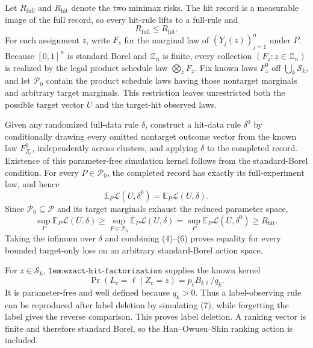 Let \(R_{\mathrm{full}}\) and \(R_{\mathrm{hit}}\) denote the two minimax risks.  The hit record is a measurable image of the full record, so every hit-rule lifts to a full-rule and
\[
 R_{\mathrm{full}}\leq R_{\mathrm{hit}}. \tag{4}
\]
For each assignment \(z\), write \(F_z\) for the marginal law of \((Y_j(z))_{j=1}^n\) under \(P\).  Because \([0,1]^n\) is standard Borel and \(\mathcal Z_n\) is finite, every collection \((F_z:z\in\mathcal Z_n)\) is realized by the legal product schedule law \(\bigotimes_zF_z\).  Fix known laws \(F_z^0\) off \(\bigcup_k\mathcal S_k\), and let \(\mathcal P_0\) contain the product schedule laws having those nontarget marginals and arbitrary target marginals.  This restriction leaves unrestricted both the possible target vector \(U\) and the target-hit observed laws.

Given any randomized full-data rule \(\delta\), construct a hit-data rule \(\delta^0\) by conditionally drawing every omitted nontarget outcome vector from the known law \(F_{Z_c}^0\), independently across clusters, and applying \(\delta\) to the completed record.  Existence of this parameter-free simulation kernel follows from the standard-Borel condition.  For every \(P\in\mathcal P_0\), the completed record has exactly its full-experiment law, and hence
\[
 \mathbb E_P\mathcal L(U,\delta^0)=\mathbb E_P\mathcal L(U,\delta). \tag{5}
\]
Since \(\mathcal P_0\subseteq\mathcal P\) and its target marginals exhaust the reduced parameter space,
\[
 \sup_P\mathbb E_P\mathcal L(U,\delta)
 \geq\sup_{P\in\mathcal P_0}\mathbb E_P\mathcal L(U,\delta)
 =\sup_P\mathbb E_P\mathcal L(U,\delta^0)
 \geq R_{\mathrm{hit}}. \tag{6}
\]
Taking the infimum over \(\delta\) and combining (4)--(6) proves equality for every bounded target-only loss on an arbitrary standard-Borel action space.

For \(z\in\mathcal S_k\), \(\texttt{lem:exact-hit-factorization}\) supplies the known kernel
\[
 \Pr(L_c=\ell\mid Z_c=z)=p_\ell B_{k\ell}/q_k. \tag{7}
\]
It is parameter-free and well defined because \(q_k>0\).  Thus a label-observing rule can be reproduced after label deletion by simulating (7), while forgetting the label gives the reverse comparison.  This proves label deletion.  A ranking vector is finite and therefore standard Borel, so the Han--Owusu--Shin ranking action is included.